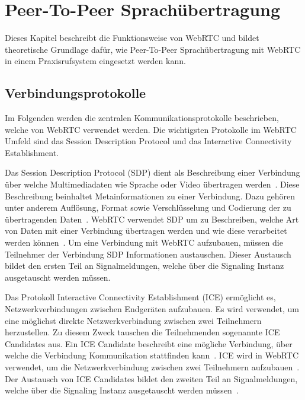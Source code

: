 \section{Peer-To-Peer Sprachübertragung}

Dieses Kapitel beschreibt die Funktionsweise von WebRTC und bildet theoretische Grundlage dafür, wie Peer-To-Peer Sprachübertragung mit WebRTC in einem Praxisrufsystem eingesetzt werden kann.

\subsection{Verbindungsprotokolle}

Im Folgenden werden die zentralen Kommunikationsprotokolle beschrieben, welche von WebRTC verwendet werden.
Die wichtigsten Protokolle im WebRTC Umfeld sind das Session Description Protocol und das Interactive Connectivity Establishment.

Das Session Description Protocol (SDP) dient als Beschreibung einer Verbindung über welche Multimediadaten wie Sprache oder Video übertragen werden~\cite{rfc_4566_sdp}.
Diese Beschreibung beinhaltet Metainformationen zu einer Verbindung.
Dazu gehören unter anderem Auflösung, Format sowie Verschlüsselung und Codierung der zu übertragenden Daten~\cite{mozilla_webRTC_protocols}.
WebRTC verwendet SDP um zu Beschreiben, welche Art von Daten mit einer Verbindung übertragen werden und wie diese verarbeitet werden können~\cite{webrtc_spec}.
Um eine Verbindung mit WebRTC aufzubauen, müssen die Teilnehmer der Verbindung SDP Informationen austauschen.
Dieser Austausch bildet den ersten Teil an Signalmeldungen, welche über die Signaling Instanz ausgetauscht werden müssen.

Das Protokoll Interactive Connectivity Establishment (ICE) ermöglicht es, Netzwerkverbindungen zwischen Endgeräten aufzubauen.
Es wird verwendet, um eine möglichst direkte Netzwerkverbindung zwischen zwei Teilnehmern herzustellen.
Zu diesem Zweck tauschen die Teilnehmenden sogenannte ICE Candidates aus.
Ein ICE Candidate beschreibt eine mögliche Verbindung, über welche die Verbindung Kommunikation stattfinden kann~\cite{rfc_8445_ice}.
ICE wird in WebRTC verwendet, um die Netzwerkverbindung zwischen zwei Teilnehmern aufzubauen~\cite{mozilla_webRTC_protocols}.
Der Austausch von ICE Candidates bildet den zweiten Teil an Signalmeldungen, welche über die Signaling Instanz ausgetauscht werden müssen~\cite{webrtc_spec}.

